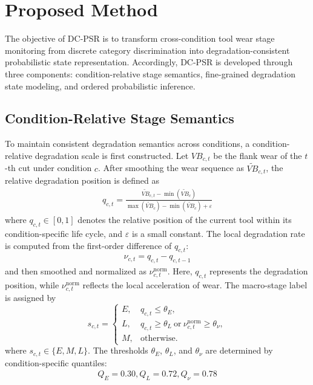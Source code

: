 \documentclass[a4paper,fleqn]{cas-sc}
\begin{document}
\section{Proposed Method}
\label{sec:method}
The objective of DC-PSR is to transform cross-condition tool wear stage monitoring from discrete category discrimination into degradation-consistent probabilistic state representation. Accordingly, DC-PSR is developed through three components: condition-relative stage semantics, fine-grained degradation state modeling, and ordered probabilistic inference.

\subsection{Condition-Relative Stage Semantics}
\label{sec:stage_semantics}
To maintain consistent degradation semantics across conditions, a condition-relative degradation scale is first constructed. Let $VB_{c,t}$ be the flank wear of the $t$-th cut under condition $c$. After smoothing the wear sequence as $\widetilde{VB}_{c,t}$, the relative degradation position is defined as
\begin{equation}
  \begin{aligned}
    q_{c,t} =
    \frac{
    \widetilde{VB}_{c,t}-\min(\widetilde{VB}_{c})
    }{
    \max(\widetilde{VB}_{c})-\min(\widetilde{VB}_{c})+\varepsilon
    }
  \end{aligned}
\label{eq:q_true}
\end{equation}
where $q_{c,t}\in [0,1]$ denotes the relative position of the current tool within its condition-specific life cycle, and $\varepsilon$ is a small constant. The local degradation rate is computed from the first-order difference of $q_{c,t}$:
\begin{equation}
  \begin{aligned}
    \nu_{c,t}=q_{c,t}-q_{c,t-1}
  \end{aligned}
\label{eq:local_rate}
\end{equation}
and then smoothed and normalized as $\nu_{c,t}^{\mathrm{norm}}$. Here, $q_{c,t}$ represents the degradation position, while $\nu_{c,t}^{\mathrm{norm}}$ reflects the local acceleration of wear. The macro-stage label is assigned by
\begin{equation}
	s_{c,t} =
	\begin{cases}
		E, & q_{c,t}\le \theta_E,\\
		L, & q_{c,t}\ge \theta_L \ \text{or}\ \nu_{c,t}^{\mathrm{norm}}\ge \theta_\nu,\\
		M, & \text{otherwise}.
	\end{cases}
	\label{eq:stage_label}
\end{equation}
  where $s_{c,t}\in \{E,M,L\}$. The thresholds $\theta_{E}$, $\theta_{L}$, and $\theta_{\nu}$ are determined by condition-specific quantiles:
  \begin{equation}
    \begin{aligned}
      Q_{E}=0.30,Q_{L}=0.72,Q_{\nu}=0.78
    \end{aligned}
  \end{equation}
  
\end{document}
